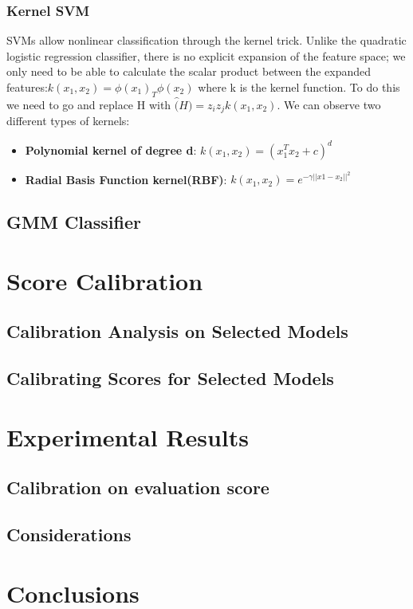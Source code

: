 \documentclass{article}
\begin{document}
\subsubsection{Kernel SVM}
SVMs allow nonlinear classification through the kernel trick. 
Unlike the quadratic logistic regression classifier, there is no explicit expansion of the feature space; 
we only need to be able to calculate the scalar product between the expanded features:\( k(x_1,x_2)=\phi(x_1)_T\phi(x_2)\) where k is the kernel function.
To do this we need to go and replace H with \(\hat(H)= z_iz_jk(x_1,x_2)\). 
We can observe two different types of kernels:
\begin{itemize}
    \item \textbf{Polynomial kernel of degree d}: \(k(x_1,x_2)=(x_1^Tx_2+c)^d\)
    \item \textbf{Radial Basis Function kernel(RBF)}: \(k(x_1,x_2)=e^{-\gamma||x1-x_2||^2}\)
\end{itemize}
\subsection{GMM Classifier}
\section{Score Calibration}
\subsection{Calibration Analysis on Selected Models}
\subsection{Calibrating Scores for Selected Models}
\section{Experimental Results}
\subsection{Calibration on evaluation score}
\subsection{Considerations}
\section{Conclusions}


\newpage



\end{document}
